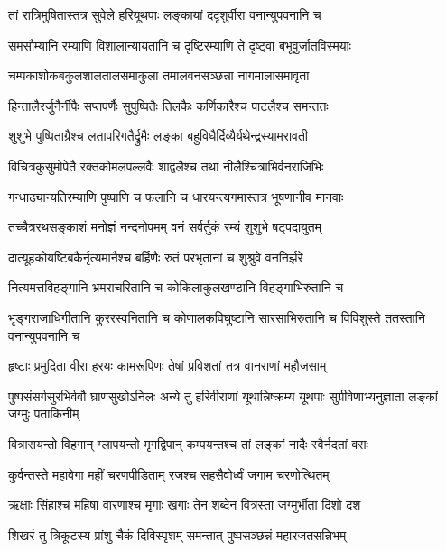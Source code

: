 
\twolineshloka
{तां रात्रिमुषितास्तत्र सुवेले हरियूथपाः}
{लङ्कायां ददृशुर्वीरा वनान्युपवनानि च} %

\twolineshloka
{समसौम्यानि रम्याणि विशालान्यायतानि च}
{दृष्टिरम्याणि ते दृष्ट्वा बभूवुर्जातविस्मयाः} %

\twolineshloka
{चम्पकाशोकबकुलशालतालसमाकुला}
{तमालवनसञ्छन्ना नागमालासमावृता} %

\twolineshloka
{हिन्तालैरर्जुनैर्नीपैः सप्तपर्णैः सुपुष्पितैः}
{तिलकैः कर्णिकारैश्च पाटलैश्च समन्ततः} %

\twolineshloka
{शुशुभे पुष्पिताग्रैश्च लतापरिगतैर्द्रुमैः}
{लङ्का बहुविधैर्दिव्यैर्यथेन्द्रस्यामरावती} %

\twolineshloka
{विचित्रकुसुमोपेतै रक्तकोमलपल्लवैः}
{शाद्वलैश्च तथा नीलैश्चित्राभिर्वनराजिभिः} %

\twolineshloka
{गन्धाढ्यान्यतिरम्याणि पुष्पाणि च फलानि च}
{धारयन्त्यगमास्तत्र भूषणानीव मानवाः} %

\twolineshloka
{तच्चैत्ररथसङ्काशं मनोज्ञं नन्दनोपमम्}
{वनं सर्वर्तुकं रम्यं शुशुभे षट्पदायुतम्} %

\twolineshloka
{दात्यूहकोयष्टिबकैर्नृत्यमानैश्च बर्हिणैः}
{रुतं परभृतानां च शुश्रुवे वननिर्झरे} %

\twolineshloka
{नित्यमत्तविहङ्गानि भ्रमराचरितानि च}
{कोकिलाकुलखण्डानि विहङ्गाभिरुतानि च} %

\threelineshloka
{भृङ्गराजाधिगीतानि कुररस्वनितानि च}
{कोणालकविघुष्टानि सारसाभिरुतानि च}
{विविशुस्ते ततस्तानि वनान्युपवनानि च} %

\twolineshloka
{हृष्टाः प्रमुदिता वीरा हरयः कामरूपिणः}
{तेषां प्रविशतां तत्र वानराणां महौजसाम्} %

\threelineshloka
{पुष्पसंसर्गसुरभिर्ववौ घ्राणसुखोऽनिलः}
{अन्ये तु हरिवीराणां यूथान्निष्क्रम्य यूथपाः}
{सुग्रीवेणाभ्यनुज्ञाता लङ्कां जग्मुः पताकिनीम्} %

\twolineshloka
{वित्रासयन्तो विहगान् ग्लापयन्तो मृगद्विपान्}
{कम्पयन्तश्च तां लङ्कां नादैः स्वैर्नदतां वराः} %

\twolineshloka
{कुर्वन्तस्ते महावेगा महीं चरणपीडिताम्}
{रजश्च सहसैवोर्ध्वं जगाम चरणोत्थितम्} %

\twolineshloka
{ऋक्षाः सिंहाश्च महिषा वारणाश्च मृगाः खगाः}
{तेन शब्देन वित्रस्ता जग्मुर्भीता दिशो दश} %

\twolineshloka
{शिखरं तु त्रिकूटस्य प्रांशु चैकं दिविस्पृशम्}
{समन्तात् पुष्पसञ्छन्नं महारजतसन्निभम्} %

